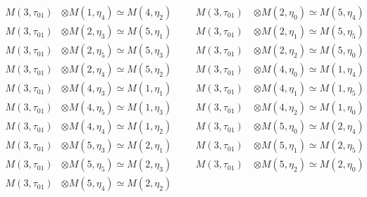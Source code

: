 \begin{align*}
M(3,\tau_{01}) &\otimes M(1,\eta_{4}) \simeq M(4,\eta_{2}) &&& M(3,\tau_{01}) \
&\otimes M(2,\eta_{0}) \simeq M(5,\eta_{4})\\
M(3,\tau_{01}) &\otimes M(2,\eta_{3}) \simeq M(5,\eta_{1}) &&& M(3,\tau_{01}) \
&\otimes M(2,\eta_{1}) \simeq M(5,\eta_{5})\\
M(3,\tau_{01}) &\otimes M(2,\eta_{5}) \simeq M(5,\eta_{3}) &&& M(3,\tau_{01}) \
&\otimes M(2,\eta_{2}) \simeq M(5,\eta_{0})\\
M(3,\tau_{01}) &\otimes M(2,\eta_{4}) \simeq M(5,\eta_{2}) &&& M(3,\tau_{01}) \
&\otimes M(4,\eta_{0}) \simeq M(1,\eta_{4})\\
M(3,\tau_{01}) &\otimes M(4,\eta_{3}) \simeq M(1,\eta_{1}) &&& M(3,\tau_{01}) \
&\otimes M(4,\eta_{1}) \simeq M(1,\eta_{5})\\
M(3,\tau_{01}) &\otimes M(4,\eta_{5}) \simeq M(1,\eta_{3}) &&& M(3,\tau_{01}) \
&\otimes M(4,\eta_{2}) \simeq M(1,\eta_{0})\\
M(3,\tau_{01}) &\otimes M(4,\eta_{4}) \simeq M(1,\eta_{2}) &&& M(3,\tau_{01}) \
&\otimes M(5,\eta_{0}) \simeq M(2,\eta_{4})\\
M(3,\tau_{01}) &\otimes M(5,\eta_{3}) \simeq M(2,\eta_{1}) &&& M(3,\tau_{01}) \
&\otimes M(5,\eta_{1}) \simeq M(2,\eta_{5})\\
M(3,\tau_{01}) &\otimes M(5,\eta_{5}) \simeq M(2,\eta_{3}) &&& M(3,\tau_{01}) \
&\otimes M(5,\eta_{2}) \simeq M(2,\eta_{0})\\
M(3,\tau_{01}) &\otimes M(5,\eta_{4}) \simeq M(2,\eta_{2})\\
\end{align*}

